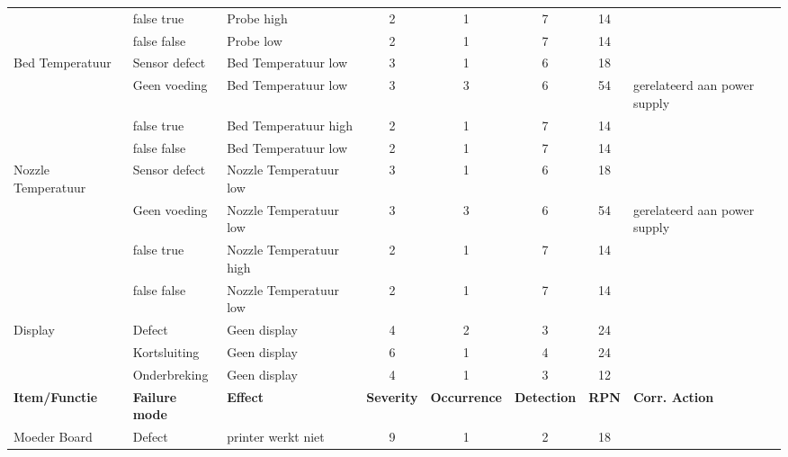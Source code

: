 \documentclass{article}
\begin{document}
\begin{landscape}
\begin{longtable}{|l|l|l|c|c|c|c|l|}
                                            & false true        & Probe high & 2 & 1 & 7 & 14 & \\
                                            & false false       & Probe low  & 2 & 1 & 7 & 14 & \\ 
                                            \hline
        \multirow{4}{*}{Bed Temperatuur}    & Sensor defect     & Bed Temperatuur low  & 3 & 1 & 6 & 18 & \\
                                            & Geen voeding      & Bed Temperatuur low  & 3 & 3 & 6 & 54 & gerelateerd aan power supply\\
                                            & false true        & Bed Temperatuur high & 2 & 1 & 7 & 14 & \\
                                            & false false       & Bed Temperatuur low  & 2 & 1 & 7 & 14 & \\ 
                                            \hline
        \multirow{4}{*}{Nozzle Temperatuur} & Sensor defect     & Nozzle Temperatuur low  & 3 & 1 & 6 & 18 & \\
                                            & Geen voeding      & Nozzle Temperatuur low  & 3 & 3 & 6 & 54 & gerelateerd aan power supply\\
                                            & false true        & Nozzle Temperatuur high & 2 & 1 & 7 & 14 & \\
                                            & false false       & Nozzle Temperatuur low  & 2 & 1 & 7 & 14 & \\ 
                                            \hline          
        \multirow{3}{*}{Display}            & Defect            & Geen display  & 4 & 2 & 3 & 24 & \\ 
                                            & Kortsluiting      & Geen display  & 6 & 1 & 4 & 24 & \\
                                            & Onderbreking      & Geen display  & 4 & 1 & 3 & 12 & \\
                                            \hline 
        \newpage
        \hline
        \textbf{Item/Functie} & \textbf{Failure mode} & \textbf{Effect} & \textbf{Severity} & \textbf{Occurrence} & \textbf{Detection} & \textbf{RPN} & \textbf{Corr. Action} \\ \hline
        \multirow{15}{*}{Moeder Board}      & Defect                    & printer werkt niet        & 9 & 1 & 2 & 18 & \\

\end{longtable}
\end{landscape}
\end{document}
